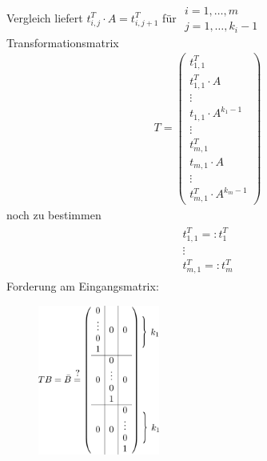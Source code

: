 \documentclass[ngerman]{tudscrreprt}
\begin{document}
Vergleich liefert $t_{i,j}^T \cdot A = t_{i,j+1}^T $ für $\substack{ i = 1,\dots, m\\ j = 1,\dots, k_i-1}$
\\ Transformationsmatrix \begin{align*}
T = \left(
\begin{array}{ c }
t_{1,1}^T \\ t_{1,1}^T\cdot A\\ \vdots\\ t_{1,1}\cdot A^{k_1 -1}\\ \hline \vdots\\ \hline t_{m,1}^T\\ t_{m,1}\cdot A\\ \vdots\\ t_{m,1}^T\cdot A^{k_m-1}
\end{array}
\right)
\end{align*} noch zu bestimmen \begin{align*} \begin{matrix} t_{1,1}^T =: t_1^T\\ \vdots\\ t_{m,1}^T =: t_m^T\end{matrix}\end{align*} 
Forderung am Eingangsmatrix: 
\begin{figure}[H]
\centering
\def\svgwidth{200pt} 
  \includegraphics[width=4cm]{images/TBmatrix.pdf}
\end{figure}
\end{document}
